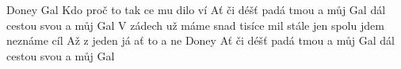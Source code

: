 \begin{TEXT}{Doney Gal}
\SLOKA Kdo  proč to  tak ce  \NL
{} mu dilo ví  
\REFREN  Ať  či déšť padá tmou \NL
{} a můj  Gal   \NL
{} dál cestou svou \NL
{} a můj  Gal   
\SLOKA V zádech už máme snad tisíce mil \NL
stále jen spolu jdem neznáme cíl 
\SLOKA Až z  jeden    \NL
já ať to  a ne  Doney 
\REFREN  Ať  či déšť padá tmou \NL
{} a můj  Gal   \NL
{} dál cestou svou \NL
{} a můj  Gal   
\end{TEXT}
